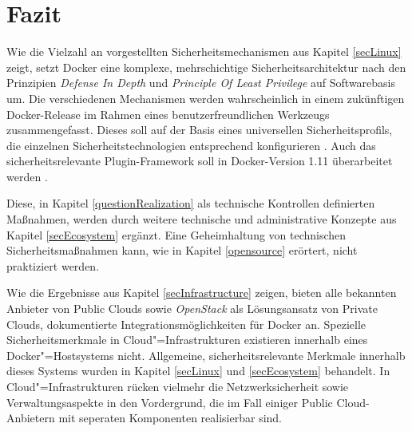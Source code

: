 \documentclass[../main.tex]{subfiles}
\begin{document}
\chapter{Fazit}
\label{result}

  Wie die Vielzahl an vorgestellten Sicherheitsmechanismen aus Kapitel \ref{secLinux} zeigt, setzt Docker eine komplexe, mehrschichtige Sicherheitsarchitektur nach den Prinzipien \emph{Defense In Depth} und \emph{Principle Of Least Privilege} auf Softwarebasis um. Die verschiedenen Mechanismen werden wahrscheinlich in einem zukünftigen Docker-Release im Rahmen eines benutzerfreundlichen Werkzeugs zusammengefasst. Dieses soll auf der Basis eines universellen Sicherheitsprofils, die einzelnen Sicherheitstechnologien entsprechend konfigurieren \cite{githubGeneralSecProfiles}. Auch das sicherheitsrelevante Plugin-Framework soll in Docker-Version 1.11 überarbeitet werden \cite{githubDockerRoadmap}\cite{githubAuthZPluginInfrastructure}.

  Diese, in Kapitel \ref{questionRealization} als technische Kontrollen definierten Maßnahmen, werden durch weitere technische und administrative Konzepte aus Kapitel \ref{secEcosystem} ergänzt. Eine Geheimhaltung von technischen Sicherheitsmaßnahmen kann, wie in Kapitel \ref{opensource} erörtert, nicht praktiziert werden.

  Wie die Ergebnisse aus Kapitel \ref{secInfrastructure} zeigen, bieten alle bekannten Anbieter von Public Clouds sowie \emph{OpenStack} als Lösungsansatz von Private Clouds, dokumentierte Integrationsmöglichkeiten für Docker an. Spezielle Sicherheitsmerkmale in Cloud"=Infrastrukturen existieren innerhalb eines Docker"=Hostsystems nicht. Allgemeine, sicherheitsrelevante Merkmale innerhalb dieses Systems wurden in Kapitel \ref{secLinux} und \ref{secEcosystem} behandelt. In Cloud"=Infrastrukturen rücken vielmehr die Netzwerksicherheit sowie Verwaltungsaspekte in den Vordergrund, die im Fall einiger Public Cloud-Anbietern mit seperaten Komponenten realisierbar sind.
\end{document}
